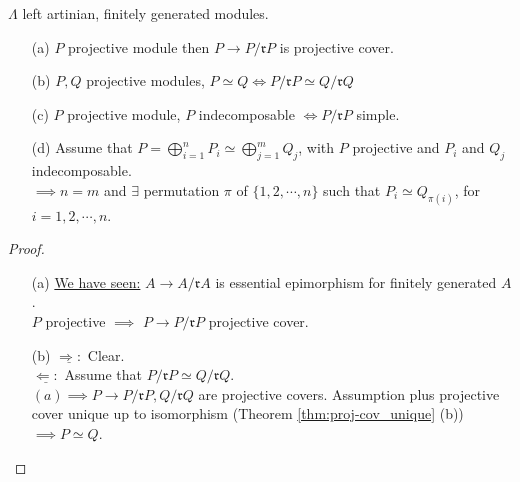 \begin{prop}
\label{prop:P_and_rP}
$\Lambda$ left artinian, finitely generated modules.
\begin{enumerate}
\item[(a)] $P$ projective module then $P \to P/\mathfrak{r}P$ is projective cover.
\item[(b)] $P,Q$ projective modules, $P \simeq Q \iff P/\mathfrak{r}P \simeq Q/\mathfrak{r}Q$
\item[(c)] $P$ projective module, $P$ indecomposable $\iff P/\mathfrak{r}P$ simple.
\item[(d)] Assume that $P = \bigoplus_{i=1}^n P_i \simeq \bigoplus_{j=1}^m Q_j$, with $P$ projective and $P_i$ and $Q_j$ indecomposable.\\
$\implies n = m$ and $\exists $ permutation $\pi$ of $\{ 1, 2, \cdots, n \}$ such that $P_i \simeq Q_{\pi(i)}$, for $i=1,2,\cdots,n$.
\end{enumerate}
\begin{proof}
\begin{enumerate}
\item[]
\item[(a)] \underline{We have seen:} $A \to A/\mathfrak{r}A$ is essential epimorphism for finitely generated $A$.\\
$P$ projective $\implies$ $P \to P/\mathfrak{r}P$ projective cover.

\item[(b)] $\underline{\Rightarrow :}$ Clear.\\
$\underline{\Leftarrow:}$ Assume that $P/\mathfrak{r}P \simeq Q/\mathfrak{r}Q$.\\
$(a) \implies P \to P/\mathfrak{r}P, Q/\mathfrak{r}Q$ are projective covers. Assumption plus projective cover unique up to isomorphism (Theorem \ref{thm:proj-cov_unique} (b)) $\implies P \simeq Q$.


\end{enumerate}
\end{proof}
\end{prop}
